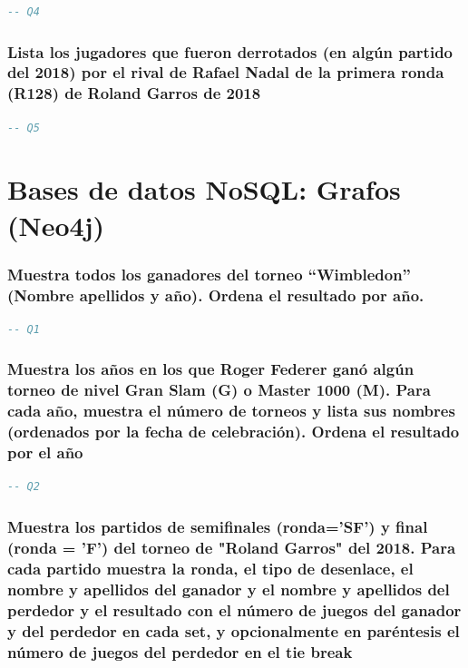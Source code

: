 \documentclass[10pt]{opticajnl}
\begin{document}
\begin{lstlisting}[language=SQL]
-- Q4
\end{lstlisting}





\subsubsection{Lista los jugadores que fueron derrotados (en algún partido del 2018) por el rival de Rafael Nadal de la primera ronda (R128) de Roland Garros de 2018}

\begin{lstlisting}[language=SQL]
-- Q5
\end{lstlisting}


\section{Bases de datos NoSQL: Grafos (Neo4j)}

\subsubsection{Muestra todos los ganadores del torneo ``Wimbledon'' (Nombre apellidos y año). Ordena el resultado por año.}

\begin{lstlisting}[language=SQL]
-- Q1
\end{lstlisting}





\subsubsection{Muestra los años en los que Roger Federer ganó algún torneo de nivel Gran Slam (G) o Master 1000 (M). Para cada año, muestra el número de torneos y lista sus nombres (ordenados por la fecha de celebración). Ordena el resultado por el año}

\begin{lstlisting}[language=SQL]
-- Q2
\end{lstlisting}





\subsubsection{Muestra los partidos de semiﬁnales (ronda='SF') y ﬁnal (ronda = 'F') del torneo de "Roland Garros" del 2018. Para cada partido muestra la ronda, el tipo de desenlace, el nombre y apellidos del ganador y el nombre y apellidos del perdedor y el resultado con el número de juegos del ganador y del perdedor en cada set, y opcionalmente en paréntesis el número de juegos del perdedor en el tie break}
\end{document}
